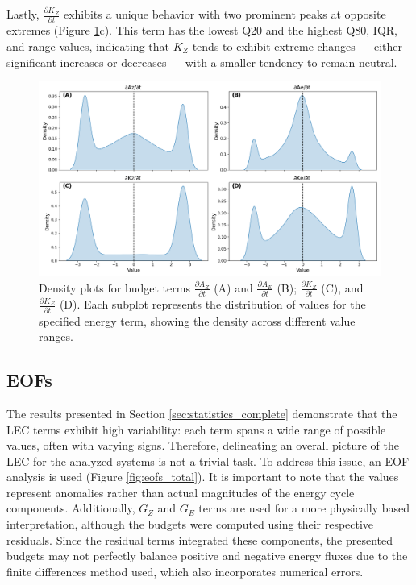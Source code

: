 Lastly, $\frac{\partial K_Z}{\partial t}$ exhibits a unique behavior with two prominent peaks at opposite extremes (Figure \ref{fig:ridge_plot_Budgets_total}c). This term has the lowest Q20 and the highest Q80, IQR, and range values, indicating that $K_Z$ tends to exhibit extreme changes — either significant increases or decreases — with a smaller tendency to remain neutral.


\begin{figure}[!htbp]
\centering
\includegraphics[width=32pc]{figs_5/ridge_plot_Budgets_total.png}
\caption[Density Plots - Budget Terms]{Density plots for budget terms $\frac{\partial A_Z}{\partial t}$ (A) and $\frac{\partial A_E}{\partial t}$ (B); $\frac{\partial K_Z}{\partial t}$ (C), and $\frac{\partial K_E}{\partial t}$ (D). Each subplot represents the distribution of values for the specified energy term, showing the density across different value ranges.}
\label{fig:ridge_plot_Budgets_total}
\end{figure}

\subsection{EOFs}

The results presented in Section \ref{sec:statistics_complete} demonstrate that the LEC terms exhibit high variability: each term spans a wide range of possible values, often with varying signs. Therefore, delineating an overall picture of the LEC for the analyzed systems is not a trivial task. To address this issue, an EOF analysis is used (Figure \ref{fig:eofs_total}). It is important to note that the values represent anomalies rather than actual magnitudes of the energy cycle components. Additionally, $G_Z$ and $G_E$ terms are used for a more physically based interpretation, although the budgets were computed using their respective residuals. Since the residual terms integrated these components, the presented budgets may not perfectly balance positive and negative energy fluxes due to the finite differences method used, which also incorporates numerical errors.

